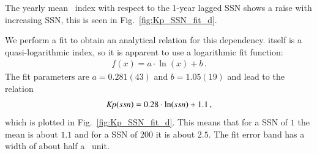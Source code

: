 The yearly mean \Kp~index with respect to the 1-year lagged SSN shows a raise with increasing SSN, this is seen in Fig.~\ref{fig:Kp_SSN_fit_d}.
\begin{figure}
\end{figure}
We perform a fit to obtain an analytical relation for this dependency. \Kp{} itself is a quasi-logarithmic index, so it is apparent to use a logarithmic fit function:
\begin{align}
	f(x) = a \cdot \ln(x) + b	\,.	\label{eq:log_fit_function}
\end{align}
The fit parameters are $a = 0.281(43)$ and $b = 1.05(19)$ and lead to the relation
\begin{align}
	\textit{Kp}(ssn) = 0.28 \cdot \ln(ssn) + 1.1	\,,	\label{eq:kp_ssn_relation}
\end{align}
which is plotted in Fig.~\ref{fig:Kp_SSN_fit_d}. This means that for a SSN of $1$ the mean \Kp{} is about $1.1$ and for a SSN of 200 it is about $2.5$. The fit error band has a width of about half a \Kp~unit.

